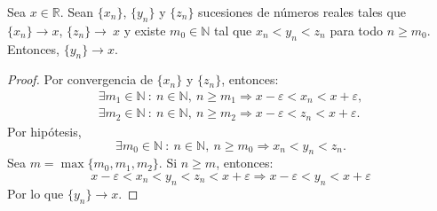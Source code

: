 \begin{lema}\label{lema:5.3.5}
    Sea $x \in \mathbb{R}$. Sean $\{x_n\}$, $\{y_n\}$ y $\{z_n\}$ sucesiones de números reales tales que
    $\{x_n\} \longrightarrow x$, $\{z_n\} \longrightarrow~x$ y existe $m_0 \in \mathbb{N}$ tal que
    $x_n < y_n < z_n$ para todo $n \geq m_0$. Entonces, $\{y_n\} \longrightarrow x$.
\end{lema}
\begin{proof}
    Por convergencia de $\{x_n\}$ y $\{z_n\}$, entonces:
    \begin{gather*}
        \exists m_1 \in \mathbb{N} ~:~ n \in \mathbb{N}, ~n \geq m_1 \Longrightarrow x-\varepsilon < x_n < x+\varepsilon,\\
        \exists m_2 \in \mathbb{N} ~:~ n \in \mathbb{N}, ~n \geq m_2 \Longrightarrow x-\varepsilon < z_n < x+\varepsilon.
    \end{gather*}
    Por hipótesis,
    \begin{equation*}
        \exists m_0 \in \mathbb{N} ~:~ n \in \mathbb{N}, ~n \geq m_0 \Longrightarrow x_n < y_n < z_n.
    \end{equation*}
    Sea $m = \max \{m_0, m_1, m_2\}$. Si $n \geq m$, entonces:
    \begin{equation*}
        x-\varepsilon < x_n < y_n < z_n < x + \varepsilon \Longrightarrow x-\varepsilon < y_n < x + \varepsilon
    \end{equation*}
    Por lo que $\{y_n\} \longrightarrow x$.
\end{proof}

